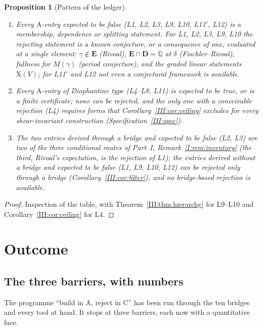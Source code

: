 \documentclass[11pt,a4paper]{article}
\newcommand{\Qbar}{\overline{\mathbb Q}}
\newcommand{\EE}{\mathbf E}
\newcommand{\DD}{\mathbf D}
\newtheorem{proposition}[theorem]{Proposition}
\theoremstyle{definition}
\theoremstyle{remark}
\numberwithin{equation}{section}
\begin{document}
\begin{proposition}[Pattern of the ledger]\label{III:prop:pattern}
\begin{enumerate}[label=(\roman*)]
\item Every $\mathrm A$-entry expected to be false (L1, L2, L3, L9, L10, L11$'$, L12) is a
membership, dependence or splitting statement. For L1, L2, L3, L9, L10 the rejecting
statement is a known conjecture, or a consequence of one, evaluated at a single element:
$\gamma\notin\EE$ (Rivoal), $\EE\cap\DD=\Qbar$ at $\delta$ (Fischler--Rivoal), fullness
for $M(\gamma)$ (period conjecture), and the graded linear statements $\mathrm X(V)$; for
L11$'$ and L12 not even a conjectural framework is available.
\item Every $\mathrm A$-entry of Diophantine type (L4--L8, L11) is expected to be true,
or is a finite certificate; none can be rejected, and the only one with a conceivable
rejection (L4) requires forms that Corollary~\ref{III:cor:ceiling} excludes for every
shear-invariant construction (Specification~\ref{III:spec}).
\item The two entries derived through a bridge and expected to be false (L2, L3) are two
of the three conditional routes of Part~I, Remark~\ref{I:rem:inventory} (the third, Rivoal's expectation,
is the rejection of L1); the entries derived without a bridge and expected to be false
(L1, L9, L10, L12) can be rejected only through a bridge (Corollary~\ref{III:cor:filter}),
and no bridge-based rejection is available.
\end{enumerate}
\end{proposition}
\begin{proof}
Inspection of the table, with Theorem~\ref{III:thm:hierarchy} for L9--L10 and
Corollary~\ref{III:cor:ceiling} for L4.
\end{proof}

\section{Outcome}\label{III:sec:outcome}

\subsection{The three barriers, with numbers}

The programme ``build in $\mathrm A$, reject in $\mathrm C$'' has been run through the
ten bridges and every tool at hand. It stops at three barriers, each now with a
quantitative face.
\end{document}
